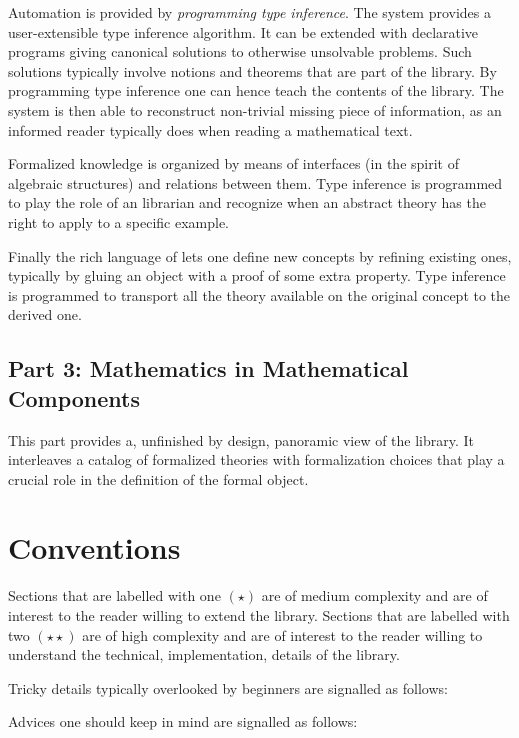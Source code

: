 Automation is provided by \emph{programming type inference}.
The \Coq{} system provides a user-extensible type inference
algorithm.  It can be extended with declarative programs
giving canonical solutions to otherwise unsolvable problems.
Such solutions typically involve notions and theorems that
are part of the \mcbMC{} library.  By programming type inference
one can hence teach \Coq{} the contents of the library.  The system
is then able to reconstruct non-trivial missing piece of information,
as an informed reader typically does when reading a mathematical text.

Formalized knowledge is organized by means of interfaces (in the spirit of
algebraic structures) and relations between them.  Type inference is programmed
to play the role of an librarian and recognize when an abstract theory has the
right to apply to a specific example.

Finally the rich language of \Coq{} lets one define new concepts
by refining existing ones, typically by gluing an object with
a proof of some extra property.  Type inference is programmed
to transport all the theory available on
the original concept to the derived one.

\subsection{Part 3: Mathematics in Mathematical Components}

This part provides a, unfinished by design, panoramic view of the
\mcbMC{} library.  It interleaves a catalog of formalized theories with
formalization choices that play a crucial role in the
definition of the formal object.

\section{Conventions}

Sections that are labelled with one $(\star)$ are of medium complexity and are
of interest to the reader willing to extend the \mcbMC{} library.  Sections
that are labelled with two $(\star\star)$ are of high complexity and are of
interest to the reader willing to understand the technical, implementation,
details of the \mcbMC{} library.

Tricky details typically overlooked by beginners are signalled as follows:

Advices one should keep in mind are signalled as follows:

